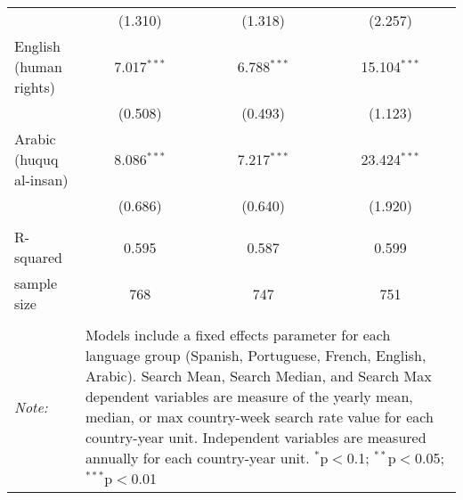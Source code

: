 \begin{table}[!htbp]
\begin{tabular}{@{\extracolsep{5pt}}lccc}
  & (1.310) & (1.318) & (2.257) \\ 
  English (human rights) & 7.017$^{***}$ & 6.788$^{***}$ & 15.104$^{***}$ \\ 
  & (0.508) & (0.493) & (1.123) \\ 
  Arabic (huquq al-insan) & 8.086$^{***}$ & 7.217$^{***}$ & 23.424$^{***}$ \\ 
  & (0.686) & (0.640) & (1.920) \\ 
 \hline \\[-1.8ex] 
R-squared  & 0.595 & 0.587 & 0.599 \\ 
sample size  & 768 & 747 & 751 \\ 
\hline 
\hline \\[-1.8ex] 
\textit{Note:}  & \multicolumn{3}{l}{\parbox[t]{8cm}{Models include a fixed effects parameter for each language group (Spanish, Portuguese, French, English, Arabic). Search Mean, Search Median, and Search Max dependent variables are measure of the yearly mean, median, or max country-week search rate value for each country-year unit. Independent variables are measured annually for each country-year unit. $^{*}$p$<$0.1; $^{**}$p$<$0.05; $^{***}$p$<$0.01}} \\ 
\end{tabular} 
\end{table} 

